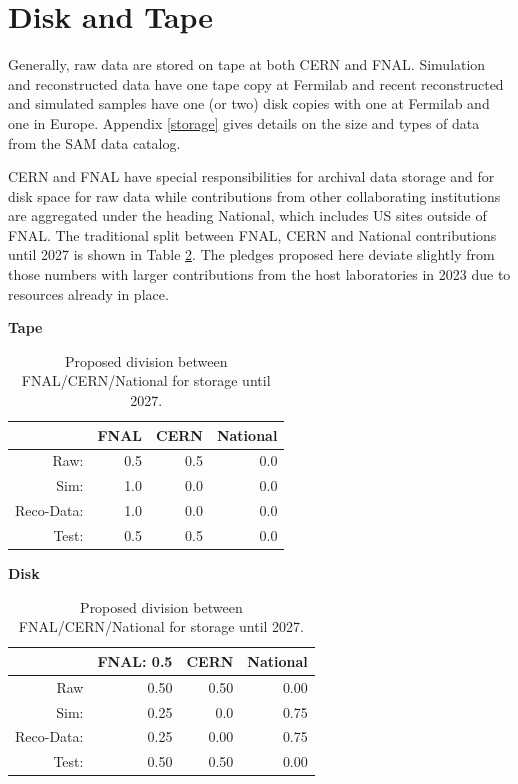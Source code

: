 \documentclass[12pt]{article}
\begin{document}
\clearpage

\section{Disk and Tape}

Generally, raw data are stored on tape at both CERN and FNAL.  Simulation and reconstructed data  have one tape copy at Fermilab and recent reconstructed and simulated samples have one (or two) disk copies with one at Fermilab and one in Europe.  Appendix \ref{storage} gives details on the size and types of data from the SAM data catalog.

CERN and FNAL have special responsibilities for archival data storage and for disk space for raw data while contributions from  other collaborating institutions are aggregated under the heading National, which includes US sites outside of FNAL.  The traditional split between FNAL, CERN and National contributions until 2027 is shown in Table \ref{tab:division}.  The pledges proposed here deviate slightly from those numbers with larger contributions from the host laboratories in 2023 due to resources already in place. 

\begin{table}[h]
\begin{centering}
{\bf Tape}
\begin{tabular}{|rrrr|}
\hline
 &FNAL&CERN & National \\
 \hline
Raw:&  0.5&  0.5&  0.0\\
Sim:& 1.0&   0.0&   0.0\\ 
Reco-Data:& 1.0&   0.0&   0.0\\
Test: &  0.5&   0.5&  0.0\\

 \hline
  \end{tabular}

   {\bf Disk}
     \begin{tabular}{|rrrr|}
     \hline
 &FNAL: 0.5&CERN & National \\
 \hline
 Raw&   0.50&   0.50&  0.00\\ 
 Sim: & 0.25&  0.0&  0.75\\
  Reco-Data: &  0.25&   0.00&  0.75\\ 
  Test: &  0.50& 0.50&   0.00\\
  \hline
   \end{tabular}
  \caption{Proposed division between FNAL/CERN/National for storage until 2027.}

   \label{tab:division}
   \end{centering}
   \end{table}
\end{document}
